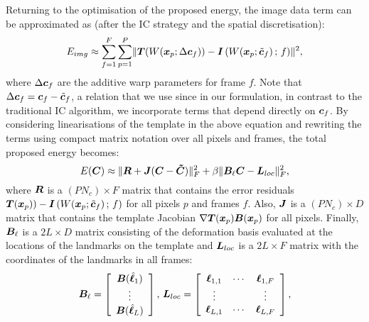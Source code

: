 Returning to the optimisation of the proposed energy, the
image data term can be approximated as (after the IC strategy and the spatial discretisation):
\begin{equation}
    E_{img} \approx \sum_{f=1}^F \sum_{p=1}^P  \lVert{} 
                                    \boldsymbol{T}(W(\boldsymbol{x}_p;\Delta \boldsymbol{c}_f)) -
                                   \boldsymbol{I}\left( W(\boldsymbol{x}_p;\tilde{\boldsymbol{c}}_f)\,;\, f \right)
                                  \rVert^2,
\end{equation}
where $\Delta \boldsymbol{c}_f$ are the additive warp parameters for frame $f$. 
Note that $\Delta \boldsymbol{c}_f = \boldsymbol{c}_f - \tilde{\boldsymbol{c}}_f$, a relation that we use since
in our formulation, in contrast to the traditional IC algorithm, we incorporate
terms that depend directly on $\boldsymbol{c}_f$.
By considering linearisations of the template in the above equation and rewriting
the terms using compact matrix notation over all pixels and frames, the total
proposed energy becomes:
\begin{equation}\label{E:ENERGY}
    E(\boldsymbol{C}) \approx \lVert{}  \boldsymbol{R} + \boldsymbol{J} (\boldsymbol{C} - \boldsymbol{\tilde{C}})  \rVert_F^2
    + \beta \lVert{} \boldsymbol{B}_\ell \boldsymbol{C} - \boldsymbol{L}_{loc} \rVert_F^2,
\end{equation}
where $\boldsymbol{R}$ is a $(P N_c) \times F$ matrix that contains the error residuals
$\boldsymbol{T}(\boldsymbol{x}_p)) - \boldsymbol{I}\left( W(\boldsymbol{x}_p;\tilde{\boldsymbol{c}}_f) \,;\, f \right)$ for all pixels
$p$ and frames $f$. Also,
$\boldsymbol{J}$ is a $(P N_c) \times D$ matrix that contains the template Jacobian
$\nabla\boldsymbol{T}(\boldsymbol{x}_p) \boldsymbol{B}(\boldsymbol{x}_p)$ for all pixels.
Finally, $\boldsymbol{B}_\ell$ is a $2L \times D$ matrix consisting of the deformation
basis evaluated at the locations of the landmarks on the template and
$\boldsymbol{L}_{loc}$ is a $2L\times F$ matrix with the coordinates of the landmarks
in all frames:
\begin{equation}
    \boldsymbol{B}_\ell=
        \left[
            \begin{array}{c}
                \boldsymbol{B}(\hat{\boldsymbol{\ell}}_1)\\
                \vdots\\
                \boldsymbol{B}(\hat{\boldsymbol{\ell}}_L)
            \end{array}
        \right] ,\,
    \boldsymbol{L}_{loc}=
        \left[
            \begin{array}{ccc}
                \boldsymbol{\ell}_{1,1}&\cdots&\boldsymbol{\ell}_{1,F}
                \\
                \vdots&&\vdots
                \\
                \boldsymbol{\ell}_{L,1}&\cdots&\boldsymbol{\ell}_{L,F}
            \end{array}
        \right],
\end{equation}


